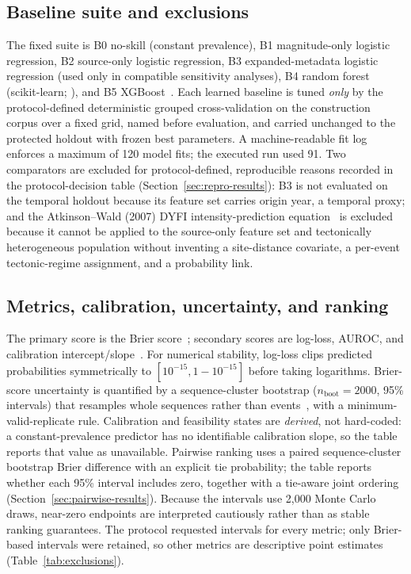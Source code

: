 \documentclass[pdflatex,sn-basic,iicol]{sn-jnl}
\begin{document}
\subsection{Baseline suite and exclusions}\label{sec:baselines}

The fixed suite is B0 no-skill (constant prevalence), B1 magnitude-only logistic
regression, B2 source-only logistic regression, B3 expanded-metadata logistic
regression (used only in compatible sensitivity analyses), B4 random forest
(scikit-learn;
\citealp{pedregosa2011sklearn}), and B5 XGBoost~\citep{chen2016xgboost}. Each learned
baseline is tuned \emph{only} by the protocol-defined deterministic grouped
cross-validation on the construction corpus over a fixed grid, named before
evaluation, and carried unchanged to the protected holdout with frozen
best parameters. A machine-readable fit log enforces a maximum of 120 model
fits; the executed run used 91. Two comparators are excluded for protocol-defined,
reproducible reasons recorded in the protocol-decision table
(Section~\ref{sec:repro-results}): B3 is
not evaluated on the temporal holdout because its feature set carries origin year, a
temporal proxy; and the Atkinson--Wald (2007) DYFI intensity-prediction
equation~\citep{atkinson2007dyfi} is excluded because it cannot be applied to
the source-only feature set and tectonically heterogeneous population without
inventing a site-distance covariate, a per-event tectonic-regime assignment, and
a probability link.

\subsection{Metrics, calibration, uncertainty, and ranking}\label{sec:metrics}

The primary score is the Brier score~\citep{brier1950}; secondary scores are
log-loss, AUROC, and calibration intercept/slope~\citep{vancalster2019calibration}.
For numerical stability, log-loss clips predicted probabilities symmetrically
to $[10^{-15},1-10^{-15}]$ before taking logarithms.
Brier-score uncertainty is quantified by a sequence-cluster bootstrap
($n_{\text{boot}}=2000$, 95\% intervals) that resamples whole sequences rather
than events~\citep{field2007bootstrap}, with a minimum-valid-replicate rule.
Calibration and feasibility states are \emph{derived}, not hard-coded: a
constant-prevalence predictor has no identifiable calibration slope, so the
table reports that value as unavailable. Pairwise ranking uses a paired
sequence-cluster bootstrap Brier difference with an explicit tie probability;
the table reports whether each 95\% interval includes zero, together with a
tie-aware joint ordering (Section~\ref{sec:pairwise-results}). Because the
intervals use 2{,}000 Monte Carlo draws, near-zero endpoints are interpreted
cautiously rather than as stable ranking guarantees.
The protocol requested intervals for every metric; only Brier-based intervals
were retained, so other metrics are descriptive point estimates
(Table~\ref{tab:exclusions}).
\end{document}

